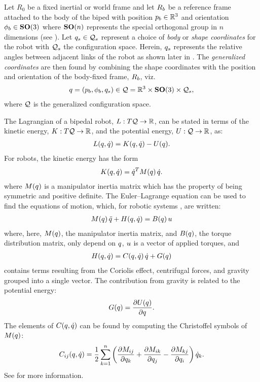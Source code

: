 Let $R_{0}$ be a fixed inertial or world frame and let $R_{b}$ be a reference
frame attached to the body of the biped with position $p_{b} \in \mathbb{R}^{3}$ and
orientation $\phi_{b} \in \mathbf{SO}(3)$ where $\mathbf{SO}(n)$ represents the special
orthogonal group in $n$ dimensions (see \cite{Conway1985}).
%
Let $q_{s} \in \mathcal{Q}_{s}$ represent a choice of {\em body} or {\em shape
  coordinates} for the robot with $\mathcal{Q}_{s}$ the configuration space.
%
Herein, $q_{s}$ represents the relative angles between adjacent links of the
robot as shown later in .
%
The {\em generalized coordinates} are then found by combining the shape
coordinates with the position and orientation of the body-fixed frame, $R_{b}$,
viz.
%
\begin{align*}
  q = (p_{b}, \phi_{b}, q_{s}) \in \mathcal{Q} = \mathbb{R}^{3} \times \mathbf{SO}(3)
  \times \mathcal{Q}_{s},
\end{align*}
%
where $\mathcal{Q}$ is the generalized configuration space.

The Lagrangian of a bipedal robot, $L : T\mathcal{Q} \to \mathbb{R}$, can be stated in terms
of the kinetic energy, $K : T\mathcal{Q} \to \mathbb{R}$, and the potential energy, $U : \mathcal{Q} \to
\mathbb{R}$, as:
%
\begin{align*}
  L(q, \dot{q}) = K(q, \dot{q}) - U(q).
\end{align*}
%
For robots, the kinetic energy has the form
\begin{align*}
  K(q, \dot{q}) = \dot{q}^{T} M(q) \, \dot{q}.
\end{align*}
where $M(q)$ is a manipulator inertia matrix which has the property of
being symmetric and positive definite.
%
The Euler--Lagrange equation can be used to find the equations of motion, which,
for robotic systems \cite[pp.~171]{Murray1994}, are written:
%
\begin{align}
  \label{eq:eom}
  M(q) \, \ddot{q} + H(q, \dot{q}) = B(q) \, u
\end{align}
%
where, here, $M(q)$, the manipulator inertia matrix, and $B(q)$, the
torque distribution matrix, only depend on $q$, $u$ is a vector of applied
torques, and
\begin{align*}
  H(q, \dot{q}) = C(q, \dot{q}) \, \dot{q} + G(q)
\end{align*}
contains terms resulting from the Coriolis effect, centrifugal forces, and
gravity grouped into a single vector.
%
The contribution from gravity is related to the potential energy:
\begin{align*}
  G(q) = \frac{\partial{U(q)}}{\partial{q}}.
\end{align*}
%
The elements of $C(q, \dot{q})$ can be found by computing the Christoffel
symbols of $M(q)$:
\begin{align*}
  C_{ij}(q, \dot{q}) = \frac{1}{2} \sum_{k = 1}^{n} \left( \frac{\partial{M_{ij}}}{\partial{q_{k}}} +
    \frac{\partial{M_{ik}}}{\partial{q_{j}}} - \frac{\partial{M_{kj}}}{\partial{q_{i}}} \right) \dot{q}_{k}.
\end{align*}
%
See \cite[pp.~170]{Murray1994} for more information.

